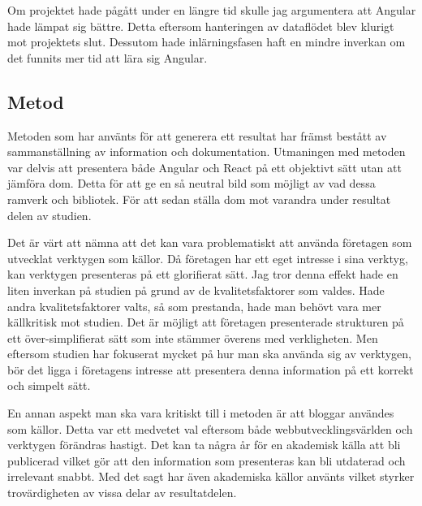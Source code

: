 Om projektet hade pågått under en längre tid skulle jag argumentera att Angular hade lämpat sig bättre. Detta eftersom hanteringen av dataflödet blev klurigt mot projektets slut. Dessutom hade inlärningsfasen haft en mindre inverkan om det funnits mer tid att lära sig Angular.

\subsection{Metod}
\label{subsec:axel-discussion-method}
Metoden som har använts för att generera ett resultat har främst bestått av sammanställning av information och dokumentation. Utmaningen med metoden var delvis att presentera både Angular och React på ett objektivt sätt utan att jämföra dom. Detta för att ge en så neutral bild som möjligt av vad dessa ramverk och bibliotek. För att sedan ställa dom mot varandra under resultat delen av studien. 

Det är värt att nämna att det kan vara problematiskt att använda företagen som utvecklat verktygen som källor. Då företagen har ett eget intresse i sina verktyg, kan verktygen presenteras på ett glorifierat sätt. Jag tror denna effekt hade en liten inverkan på studien på grund av de kvalitetsfaktorer som valdes. Hade andra kvalitetsfaktorer valts, så som prestanda, hade man behövt vara mer källkritisk mot studien. Det är möjligt att företagen presenterade strukturen på ett över-simplifierat sätt som inte stämmer överens med verkligheten. Men eftersom studien har fokuserat mycket på hur man ska använda sig av verktygen, bör det ligga i företagens intresse att presentera denna information på ett korrekt och simpelt sätt. 

En annan aspekt man ska vara kritiskt till i metoden är att bloggar användes som källor. Detta var ett medvetet val eftersom både webbutvecklingsvärlden och verktygen förändras hastigt. Det kan ta några år för en akademisk källa att bli publicerad vilket gör att den information som presenteras kan bli utdaterad och irrelevant snabbt. Med det sagt har även akademiska källor använts vilket styrker trovärdigheten av vissa delar av resultatdelen.

\pagebreak

